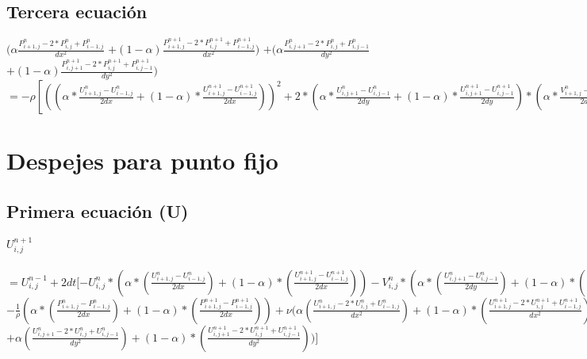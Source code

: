 \documentclass[a4paper]{article}
\begin{document}
\subsection{Tercera ecuación}
 $(\alpha \frac{P^{n}_{i+1,j} -2*P^{n}_{i,j} + P^{n}_{i-1,j}}{dx^{2}}$
 $+(1-\alpha) \frac{P^{n+1}_{i+1,j} -2*P^{n+1}_{i,j} + P^{n+1}_{i-1,j}}{dx^{2}})$
 $+(\alpha \frac{P^{n}_{i,j+1} -2*P^{n}_{i,j} + P^{n}_{i,j-1}}{dy^{2}}$ 
 $+(1-\alpha) \frac{P^{n+1}_{i,j+1} -2*P^{n+1}_{i,j} + P^{n+1}_{i,j-1}}{dy^{2}})$
 $= -\rho [ ((\alpha * \frac{U^{n}_{i+1,j} - U^{n}_{i-1,j}}{2dx} + (1-\alpha) * \frac{U^{n+1}_{i+1,j} - U^{n+1}_{i-1,j}}{2dx}))^{2} + 2 * (\alpha * \frac{U^{n}_{i,j+1} - U^{n}_{i,j-1}}{2dy} + (1- \alpha) * \frac{U^{n+1}_{i,j+1} - U^{n+1}_{i,j-1}}{2dy}) * (\alpha * \frac{V^{n}_{i+1,j}-V^{n}_{i-1,j}}{2dx} + (1-\alpha) (\frac{V^{n+1}_{i+1,j}-V^{n+1}_{i-1,j}}{2dx})) + ((\alpha * \frac{V^{n}_{i,j+1} - V^{n}_{i,j-1}}{2dy} + (1-\alpha) * \frac{V^{n+1}_{i,j+1} - V^{n+1}_{i,j-1}}{2dy}))^{2}]$



\section{Despejes para punto fijo}
\subsection{Primera ecuación (U)}
$U^{n+1}_{i,j} $
\\
\\
$= U^{n-1}_{i,j} + 2dt[- U^{n}_{i,j}*(\alpha * (\frac{U^{n}_{i+1,j} - U^{n}_{i-1,j}}{2dx}) + (1-\alpha) * (\frac{U^{n+1}_{i+1,j} - U^{n+1}_{i-1,j}}{2dx})) - V^{n}_{i,j}*(\alpha * (\frac{U^{n}_{i,j+1} - U^{n}_{i,j-1}}{2dy}) + (1-\alpha) * (\frac{U^{n+1}_{i,j+1} - U^{n+1}_{i,j-1}}{2dy}))$
\\
$ - \frac{1}{\rho}(\alpha * (\frac{P^{n}_{i+1,j} - P^{n}_{i-1,j}}{2dx}) + (1-\alpha) * (\frac{P^{n+1}_{i+1,j} - P^{n+1}_{i-1,j}}{2dx})) + \nu (\alpha (\frac{ U^{n}_{i+1,j} - 2*U^{n}_{i,j} + U^{n}_{i-1,j}}{dx^2}) + (1-\alpha)*(\frac{ U^{n+1}_{i+1,j} - 2*U^{n+1}_{i,j} + U^{n+1}_{i-1,j}}{dx^2})$
\\
$+ \alpha (\frac{ U^{n}_{i,j+1} - 2*U^{n}_{i,j} + U^{n}_{i,j-1}}{dy^2}) + (1-\alpha)*(\frac{ U^{n+1}_{i,j+1} - 2*U^{n+1}_{i,j} + U^{n+1}_{i,j-1}}{dy^2}))]$
\end{document}
